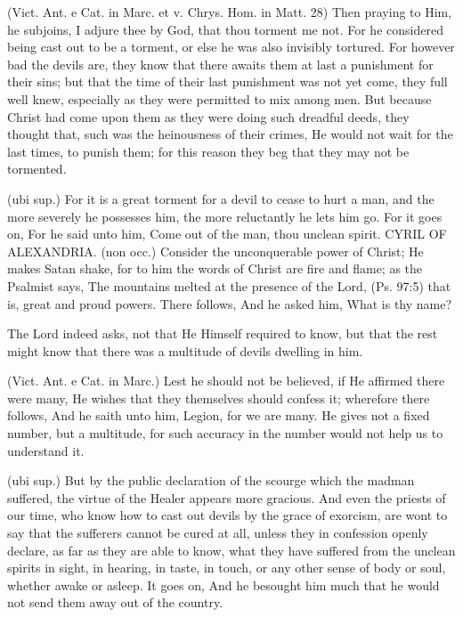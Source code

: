  (Vict. Ant. e Cat. in Marc. et v. Chrys. Hom. in Matt. 28) Then praying to Him, he subjoins, I adjure thee by God, that thou torment me not. For he considered being cast out to be a torment, or else he was also invisibly tortured. For however bad the devils are, they know that there awaits them at last a punishment for their sins; but that the time of their last punishment was not yet come, they full well knew, especially as they were permitted to mix among men. But because Christ had come upon them as they were doing such dreadful deeds, they thought that, such was the heinousness of their crimes, He would not wait for the last times, to punish them; for this reason they beg that they may not be tormented.

 (ubi sup.) For it is a great torment for a devil to cease to hurt a man, and the more severely he possesses him, the more reluctantly he lets him go. For it goes on, For he said unto him, Come out of the man, thou unclean spirit. CYRIL OF ALEXANDRIA. (non occ.) Consider the unconquerable power of Christ; He makes Satan shake, for to him the words of Christ are fire and flame; as the Psalmist says, The mountains melted at the presence of the Lord, (Ps. 97:5) that is, great and proud powers. There follows, And he asked him, What is thy name?

 The Lord indeed asks, not that He Himself required to know, but that the rest might know that there was a multitude of devils dwelling in him.

 (Vict. Ant. e Cat. in Marc.) Lest he should not be believed, if He affirmed there were many, He wishes that they themselves should confess it; wherefore there follows, And he saith unto him, Legion, for we are many. He gives not a fixed number, but a multitude, for such accuracy in the number would not help us to understand it.

 (ubi sup.) But by the public declaration of the scourge which the madman suffered, the virtue of the Healer appears more gracious. And even the priests of our time, who know how to cast out devils by the grace of exorcism, are wont to say that the sufferers cannot be cured at all, unless they in confession openly declare, as far as they are able to know, what they have suffered from the unclean spirits in sight, in hearing, in taste, in touch, or any other sense of body or soul, whether awake or asleep. It goes on, And he besought him much that he would not send them away out of the country.

